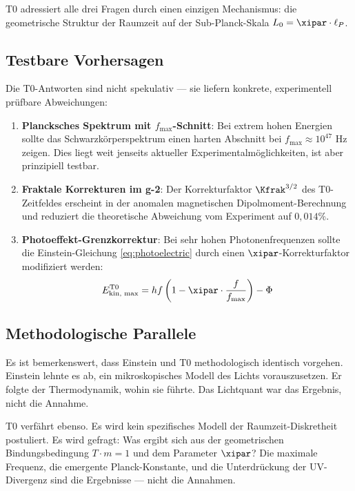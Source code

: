 T0 adressiert alle drei Fragen durch einen einzigen Mechanismus: die geometrische 
Struktur der Raumzeit auf der Sub-Planck-Skala $L_0 = \xipar \cdot \ell_P$.

\subsection{Testbare Vorhersagen}

Die T0-Antworten sind nicht spekulativ — sie liefern konkrete, experimentell 
prüfbare Abweichungen:

\begin{enumerate}
    \item \textbf{Plancksches Spektrum mit $f_{\max}$-Schnitt}: Bei extrem hohen 
    Energien sollte das Schwarzkörperspektrum einen harten Abschnitt bei 
    $f_{\max} \approx 10^{47}$ Hz zeigen. Dies liegt weit jenseits aktueller 
    Experimentalmöglichkeiten, ist aber prinzipiell testbar.
    
    \item \textbf{Fraktale Korrekturen im g-2}: Der Korrekturfaktor $\Kfrak^{3/2}$ 
    des T0-Zeitfeldes erscheint in der anomalen magnetischen Dipolmoment-Berechnung 
    und reduziert die theoretische Abweichung vom Experiment auf $0{,}014\%$.
    
    \item \textbf{Photoeffekt-Grenzkorrektur}: Bei sehr hohen Photonenfrequenzen 
    sollte die Einstein-Gleichung \eqref{eq:photoelectric} durch einen 
    $\xipar$-Korrekturfaktor modifiziert werden:
    \begin{equation}
        E_{\text{kin, max}}^{\text{T0}} = hf\left(1 - \xipar \cdot \frac{f}{f_{\max}}\right) - \Phi
        \label{eq:photoelectric_t0}
    \end{equation}
\end{enumerate}

\subsection{Methodologische Parallele}

Es ist bemerkenswert, dass Einstein und T0 methodologisch identisch vorgehen. 
Einstein lehnte es ab, ein mikroskopisches Modell des Lichts vorauszusetzen. 
Er folgte der Thermodynamik, wohin sie führte. Das Lichtquant war das Ergebnis, 
nicht die Annahme.

T0 verfährt ebenso. Es wird kein spezifisches Modell der Raumzeit-Diskretheit 
postuliert. Es wird gefragt: Was ergibt sich aus der geometrischen Bindungsbedingung 
$T \cdot m = 1$ und dem Parameter $\xipar$? Die maximale Frequenz, die emergente 
Planck-Konstante, und die Unterdrückung der UV-Divergenz sind die Ergebnisse — 
nicht die Annahmen.

